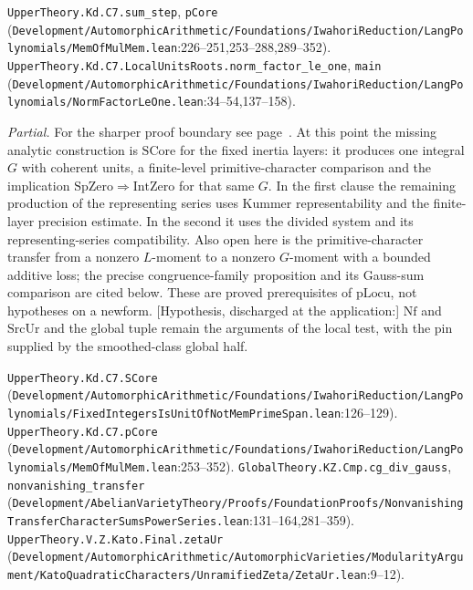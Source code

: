 {\footnotesize \nolinkurl{UpperTheory.Kd.C7.sum_step}, \nolinkurl{pCore} (\nolinkurl{Development/AutomorphicArithmetic/Foundations/IwahoriReduction/LangPolynomials/MemOfMulMem.lean}\allowbreak:226--251,253--288,289--352). \nolinkurl{UpperTheory.Kd.C7.LocalUnitsRoots.norm_factor_le_one}, \nolinkurl{main} (\nolinkurl{Development/AutomorphicArithmetic/Foundations/IwahoriReduction/LangPolynomials/NormFactorLeOne.lean}\allowbreak:34--54,137--158).}

\emph{Partial.} For the sharper proof boundary see page~\pageref{r6:Z1.3.05}. At this point the missing analytic construction is $\mathrm{SCore}$ for the fixed inertia layers: it produces one integral $G$ with coherent units, a finite-level primitive-character comparison and the implication $\mathrm{SpZero}\Rightarrow\mathrm{IntZero}$ for that same $G$. In the first clause the remaining production of the representing series uses Kummer representability and the finite-layer precision estimate. In the second it uses the divided system and its representing-series compatibility. Also open here is the primitive-character transfer from a nonzero $L$-moment to a nonzero $G$-moment with a bounded additive loss; the precise congruence-family proposition and its Gauss-sum comparison are cited below. These are proved prerequisites of $\mathrm{pLocu}$, not hypotheses on a newform. [Hypothesis, discharged at the application:] $\mathrm{Nf}$ and $\mathrm{SrcUr}$ and the global tuple remain the arguments of the local test, with the pin supplied by the smoothed-class global half.

{\footnotesize \nolinkurl{UpperTheory.Kd.C7.SCore} (\nolinkurl{Development/AutomorphicArithmetic/Foundations/IwahoriReduction/LangPolynomials/FixedIntegersIsUnitOfNotMemPrimeSpan.lean}\allowbreak:126--129). \nolinkurl{UpperTheory.Kd.C7.pCore} (\nolinkurl{Development/AutomorphicArithmetic/Foundations/IwahoriReduction/LangPolynomials/MemOfMulMem.lean}\allowbreak:253--352). \nolinkurl{GlobalTheory.KZ.Cmp.cg_div_gauss}, \nolinkurl{nonvanishing_transfer} (\nolinkurl{Development/AbelianVarietyTheory/Proofs/FoundationProofs/NonvanishingTransferCharacterSumsPowerSeries.lean}\allowbreak:131--164,281--359). \nolinkurl{UpperTheory.V.Z.Kato.Final.zetaUr} (\nolinkurl{Development/AutomorphicArithmetic/AutomorphicVarieties/ModularityArgument/KatoQuadraticCharacters/UnramifiedZeta/ZetaUr.lean}\allowbreak:9--12).}

